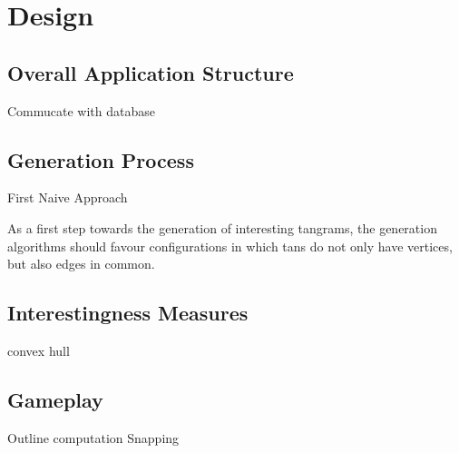 \chapter{Design}\label{chapter:design}

\section{Overall Application Structure}

Commucate with database

\section{Generation Process}

First Naive Approach

As a first step towards the generation of interesting tangrams, the generation algorithms should favour configurations in which tans do not only have vertices, but also edges in common. 

\section{Interestingness Measures}
convex hull

\section{Gameplay}
Outline computation \label{outline}
Snapping
